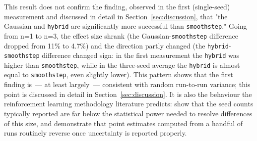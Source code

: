 This result does not confirm the finding, observed in the first (single-seed) measurement and discussed in detail in Section~\ref{sec:discussion}, that "the Gaussian and \texttt{hybrid} are significantly more successful than \texttt{smoothstep}." Going from n=1 to n=3, the effect size shrank (the Gaussian-\texttt{smoothstep} difference dropped from 11\% to 4.7\%) and the direction partly changed (the \texttt{hybrid}-\texttt{smoothstep} difference changed sign: in the first measurement the \texttt{hybrid} was higher than \texttt{smoothstep}, while in the three-seed average the \texttt{hybrid} is almost equal to \texttt{smoothstep}, even slightly lower). This pattern shows that the first finding is~--- at least largely~--- consistent with random run-to-run variance; this point is discussed in detail in Section~\ref{sec:discussion}. It is also the behaviour the reinforcement learning methodology literature predicts: \citet{colas2018} show that the seed counts typically reported are far below the statistical power needed to resolve differences of this size, and \citet{agarwal2021} demonstrate that point estimates computed from a handful of runs routinely reverse once uncertainty is reported properly.
